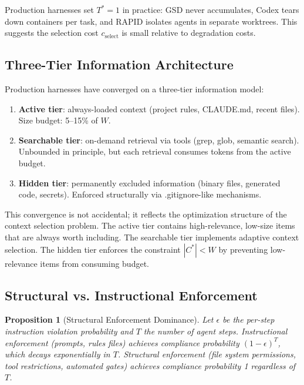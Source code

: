 \documentclass[11pt, a4paper, logo, copyright]{googledeepmind}
\newtheorem{proposition}{Proposition}[section]
\begin{document}
Production harnesses set $T^* = 1$ in practice: GSD never accumulates, Codex tears down containers per task, and RAPID isolates agents in separate worktrees. This suggests the selection cost $c_{\text{select}}$ is small relative to degradation costs.

\subsection{Three-Tier Information Architecture}

Production harnesses have converged on a three-tier information model:

\begin{enumerate}
    \item \textbf{Active tier}: always-loaded context (project rules, CLAUDE.md, recent files). Size budget: 5--15\% of $W$.
    \item \textbf{Searchable tier}: on-demand retrieval via tools (grep, glob, semantic search). Unbounded in principle, but each retrieval consumes tokens from the active budget.
    \item \textbf{Hidden tier}: permanently excluded information (binary files, generated code, secrets). Enforced structurally via .gitignore-like mechanisms.
\end{enumerate}

This convergence is not accidental; it reflects the optimization structure of the context selection problem. The active tier contains high-relevance, low-size items that are always worth including. The searchable tier implements adaptive context selection. The hidden tier enforces the constraint $|C^*| < W$ by preventing low-relevance items from consuming budget.

\subsection{Structural vs. Instructional Enforcement}

\begin{proposition}[Structural Enforcement Dominance]
\label{prop:enforcement}
Let $\epsilon$ be the per-step instruction violation probability and $T$ the number of agent steps. Instructional enforcement (prompts, rules files) achieves compliance probability $(1-\epsilon)^T$, which decays exponentially in $T$. Structural enforcement (file system permissions, tool restrictions, automated gates) achieves compliance probability 1 regardless of $T$.
\end{proposition}
\end{document}
